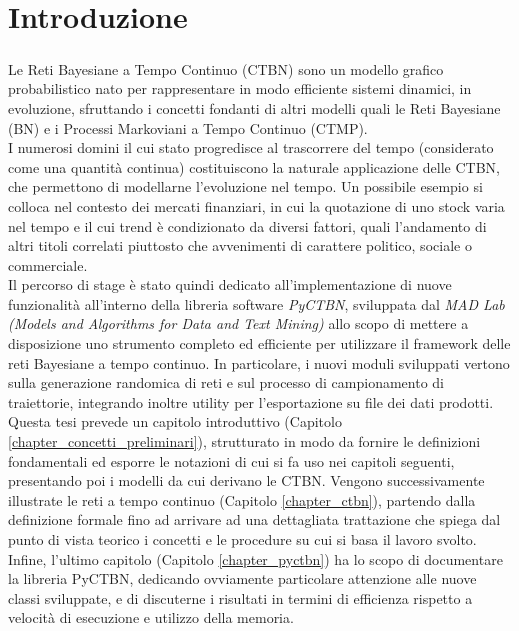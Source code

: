 \chapter*{Introduzione}
  \label{chapter_introduzione}
  \paragraph{}
  Le Reti Bayesiane a Tempo Continuo (CTBN) sono un modello grafico probabilistico nato per rappresentare in modo efficiente sistemi
  dinamici, in evoluzione, sfruttando i concetti fondanti di altri modelli quali le Reti Bayesiane (BN) 
  e i Processi Markoviani a Tempo Continuo (CTMP).\\
  I numerosi domini il cui stato progredisce al trascorrere del tempo (considerato come una quantità continua) costituiscono la naturale applicazione delle CTBN, 
  che permettono di modellarne l'evoluzione nel tempo.
  Un possibile esempio si colloca nel contesto dei mercati finanziari, in cui la quotazione di uno
  stock varia nel tempo e il cui trend è condizionato da diversi fattori, quali l'andamento di altri titoli correlati
  piuttosto che avvenimenti di carattere politico, sociale o commerciale.\\
  Il percorso di stage è stato quindi dedicato all'implementazione di nuove funzionalità all'interno
  della libreria software \textit{PyCTBN}, sviluppata dal \textit{MAD Lab (Models and Algorithms for Data and Text Mining)}
  allo scopo di mettere a disposizione uno strumento completo ed efficiente per utilizzare
  il framework delle reti Bayesiane a tempo continuo. In particolare, i nuovi moduli sviluppati
  vertono sulla generazione randomica di reti e sul processo di campionamento di traiettorie,
  integrando inoltre utility per l'esportazione su file dei dati prodotti.\\
  Questa tesi prevede un capitolo introduttivo (Capitolo \ref{chapter_concetti_preliminari}), strutturato in modo da fornire le definizioni
  fondamentali ed esporre le notazioni di cui si fa uso nei capitoli seguenti, presentando
  poi i modelli da cui derivano le CTBN. Vengono successivamente illustrate le reti a tempo continuo (Capitolo \ref{chapter_ctbn}), 
  partendo dalla definizione formale fino ad arrivare ad una dettagliata trattazione che spiega dal
  punto di vista teorico i concetti e le procedure su cui si basa il lavoro svolto.
  Infine, l'ultimo capitolo (Capitolo \ref{chapter_pyctbn}) ha lo scopo di documentare la libreria PyCTBN, dedicando ovviamente
  particolare attenzione alle nuove classi sviluppate, e di discuterne i risultati
  in termini di efficienza rispetto a velocità di esecuzione e utilizzo della memoria.